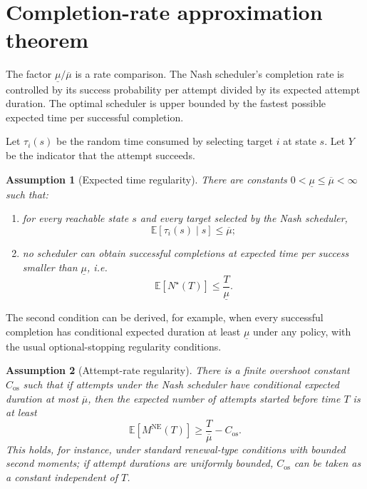 \documentclass[11pt]{article}
\newtheorem{assumption}{Assumption}
\newcommand{\E}{\mathbb{E}}
\begin{document}
\section{Completion-rate approximation theorem}

The factor $\underline\mu/\overline\mu$ is a rate comparison. The Nash scheduler's completion rate is controlled by
its success probability per attempt divided by its expected attempt duration. The optimal scheduler is upper bounded
by the fastest possible expected time per successful completion.

Let $\tau_i(s)$ be the random time consumed by selecting target $i$ at state $s$. Let $Y$ be the indicator that the
attempt succeeds.

\begin{assumption}[Expected time regularity]
There are constants $0<\underline\mu\le \overline\mu<\infty$ such that:
\begin{enumerate}[label=(\roman*)]
  \item for every reachable state $s$ and every target selected by the Nash scheduler,
  \begin{equation}
    \E[\tau_i(s)\mid s] \le \overline\mu;
    \label{eq:upper-mu}
  \end{equation}
  \item no scheduler can obtain successful completions at expected time per success smaller than $\underline\mu$, i.e.
  \begin{equation}
    \E[N^\star(T)]\le \frac{T}{\underline\mu}.
    \label{eq:optimal-rate-upper}
  \end{equation}
\end{enumerate}
\end{assumption}

The second condition can be derived, for example, when every successful completion has conditional expected duration
at least $\underline\mu$ under any policy, with the usual optional-stopping regularity conditions.

\begin{assumption}[Attempt-rate regularity]
There is a finite overshoot constant $C_{\mathrm{os}}$ such that if attempts under the Nash scheduler have conditional
expected duration at most $\overline\mu$, then the expected number of attempts started before time $T$ is at least
\begin{equation}
  \E[M^{\mathrm{NE}}(T)] \ge \frac{T}{\overline\mu}-C_{\mathrm{os}} .
  \label{eq:attempt-count-lower}
\end{equation}
This holds, for instance, under standard renewal-type conditions with bounded second moments; if attempt durations are
uniformly bounded, $C_{\mathrm{os}}$ can be taken as a constant independent of $T$.
\end{assumption}
\end{document}
